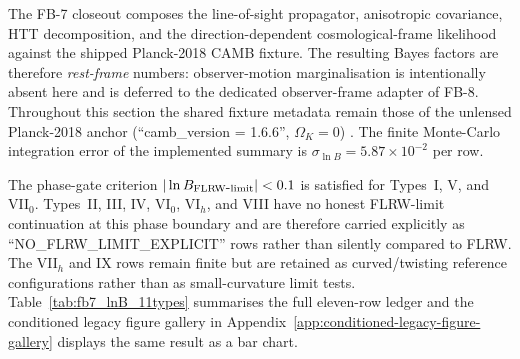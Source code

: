The FB-7 closeout composes the line-of-sight propagator, anisotropic
covariance, HTT decomposition, and the direction-dependent
cosmological-frame likelihood against the shipped Planck-2018 CAMB
fixture.  The resulting Bayes factors are therefore \emph{rest-frame}
numbers: observer-motion marginalisation is intentionally absent here
and is deferred to the dedicated observer-frame adapter of FB-8.
Throughout this section the shared fixture metadata remain those of the
unlensed Planck-2018 anchor
(``camb\_version = 1.6.6'', $\Omega_K = 0$)
\cite{Planck2018V,Planck2018VI}.  The finite Monte-Carlo integration
error of the implemented summary is
$\sigma_{\ln B} = 5.87\times 10^{-2}$ per row.

The phase-gate criterion
$|\ln B_{\rm FLRW\mbox{-}limit}| < 0.1$
is satisfied for Types~I, V, and VII$_0$.  Types~II, III, IV, VI$_0$,
VI$_h$, and VIII have no honest FLRW-limit continuation at this phase
boundary and are therefore carried explicitly as
``NO\_FLRW\_LIMIT\_EXPLICIT'' rows rather than silently compared to
FLRW.  The VII$_h$ and IX rows remain finite but are retained as
curved/twisting reference configurations rather than as small-curvature
limit tests.  Table~\ref{tab:fb7_lnB_11types} summarises the full
eleven-row ledger and the conditioned legacy figure gallery in Appendix~\ref{app:conditioned-legacy-figure-gallery} displays the same
result as a bar chart.

